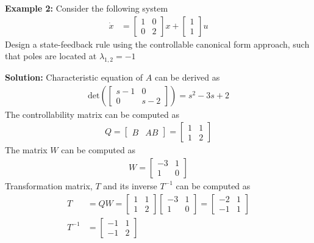 \documentclass[twoside]{article}
\begin{document}
\textbf{Example 2:} Consider the following system
%
\begin{align*}
 \dot{x} &= \left[ \begin{array}{cc} 1 & 0 \\ 0 & 2 \end{array} \right] x
    + \left[ \begin{array}{c} 1 \\ 1 \end{array} \right] u
\end{align*}
% 
Design a state-feedback rule using the controllable canonical form
approach, such that poles are located at 
$\lambda_{1,2} = -1$ 

\textbf{Solution:} Characteristic equation of $A$ can be derived as
%
\begin{align*}
 \mathrm{det} \left(  \left[ \begin{array}{cc} s-1 & 0 \\ 0 &
                                                              s-2 \end{array} \right]  \right)
 = s^2 - 3 s + 2
\end{align*}
%
The controllability matrix can be computed as
%
\begin{align*}
  Q = \left[ \begin{array}{c|c} B & A B \end{array} \right] = \left[ \begin{array}{cc} 1 & 1 \\ 1 & 2 \end{array} \right]
\end{align*}
%
The matrix $W$ can be computed as
%
\begin{align*}
  W =  \left[ \begin{array}{cc} -3 & 1 \\ 1 & 0 \end{array} \right]
\end{align*}
%
Transformation matrix, $T$ and its inverse $T^{-1}$ can be computed 
as
\begin{align*}
  T &= Q W =  
\left[ \begin{array}{cc} 1 & 1 \\ 1 & 2 \end{array} \right]
\left[ \begin{array}{cc} -3 & 1 \\ 1 & 0 \end{array} \right]
= \left[ \begin{array}{cc} -2 & 1 \\ -1 & 1 \end{array} \right]
\\
T^{-1} &= \left[ \begin{array}{cc} -1 & 1 \\ -1 & 2 \end{array} \right]
\end{align*}
\end{document}
